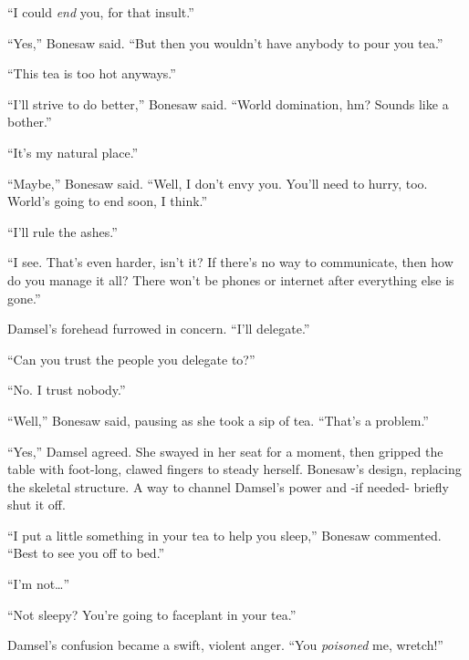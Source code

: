 ``I could \emph{end} you, for that insult.''



``Yes,'' Bonesaw said.  ``But then you wouldn't have anybody to pour you tea.''



``This tea is too hot anyways.''



``I'll strive to do better,'' Bonesaw said.  ``World domination, hm?  Sounds like a bother.''



``It's my natural place.''



``Maybe,'' Bonesaw said.  ``Well, I don't envy you.  You'll need to hurry, too.  World's going to end soon, I think.''



``I'll rule the ashes.''



``I see.  That's even harder, isn't it?  If there's no way to communicate, then how do you manage it all?  There won't be phones or internet after everything else is gone.''



Damsel's forehead furrowed in concern.  ``I'll delegate.''



``Can you trust the people you delegate to?''



``No.  I trust nobody.''



``Well,'' Bonesaw said, pausing as she took a sip of tea.  ``That's a problem.''



``Yes,'' Damsel agreed.  She swayed in her seat for a moment, then gripped the table with foot-long, clawed fingers to steady herself.  Bonesaw's design, replacing the skeletal structure.  A way to channel Damsel's power and -if needed- briefly shut it off.



``I put a little something in your tea to help you sleep,'' Bonesaw commented.  ``Best to see you off to bed.''



``I'm not\ldots''



``Not sleepy?  You're going to faceplant in your tea.''



Damsel's confusion became a swift, violent anger.  ``You \emph{poisoned} me, wretch!''



